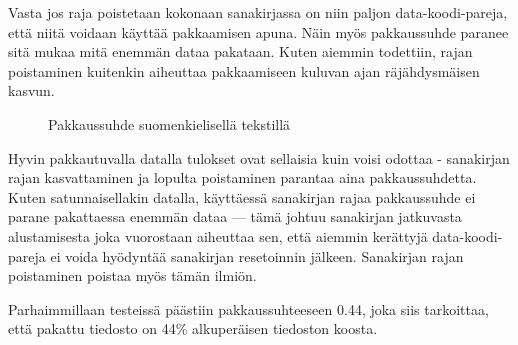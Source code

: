 \documentclass{article}
\begin{document}
Vasta jos raja poistetaan kokonaan sanakirjassa on niin paljon data-koodi-pareja, että niitä voidaan käyttää pakkaamisen apuna. Näin myös pakkaussuhde paranee sitä mukaa mitä enemmän dataa pakataan. Kuten aiemmin todettiin, rajan poistaminen kuitenkin aiheuttaa pakkaamiseen kuluvan ajan räjähdysmäisen kasvun.

\begin{figure}[h]
\centering
{}
\caption{Pakkaussuhde suomenkielisellä tekstillä}
\end{figure}

Hyvin pakkautuvalla datalla tulokset ovat sellaisia kuin voisi odottaa - sanakirjan rajan kasvattaminen ja lopulta poistaminen parantaa aina pakkaussuhdetta. Kuten satunnaisellakin datalla, käyttäessä sanakirjan rajaa pakkaussuhde ei parane pakattaessa enemmän dataa --- tämä johtuu sanakirjan jatkuvasta alustamisesta joka vuorostaan aiheuttaa sen, että aiemmin kerättyjä data-koodi-pareja ei voida hyödyntää sanakirjan resetoinnin jälkeen. Sanakirjan rajan poistaminen poistaa myös tämän ilmiön.

Parhaimmillaan testeissä päästiin pakkaussuhteeseen 0.44, joka siis tarkoittaa, että pakattu tiedosto on 44\% alkuperäisen tiedoston koosta.
\end{document}
